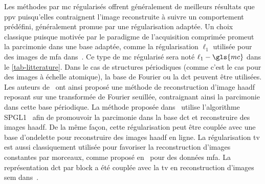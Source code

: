 Les méthodes par \gls{mc} régularisés offrent généralement de meilleurs résultats que \gls{ppv} puisqu'elles contraignent l'image reconstruite à suivre un comportement prédéfini, généralement promue par une régularisation adaptée. Un choix classique puisque motivée par le paradigme de l'acquisition comprimée promeut la parcimonie dans une base adaptée, comme la régularisation $\ell_1$ utilisée pour des images de \gls{mfa} dans~\cite{han2018optimal}. Ce type de \gls{mc} régularisé sera noté $\ell_1-\gls{mc}$ dans le \cref{tab-litterature}. %
Dans le cas de structures périodiques (comme c'est le cas pour des images à échelle atomique), la base de Fourier ou la \gls{dct} peuvent être utilisées. Les auteurs de~\cite{stevens2018apl} ont ainsi proposé une méthode de reconstruction d'image \gls{haadf} reposant sur une transformée de Fourier seuillée, contraignant ainsi la parcimonie dans cette base périodique. La méthode proposée dans~\cite{beche2016development} utilise l'algorithme SPGL1~\cite{berg2008probing} afin de promouvoir la parcimonie dans la base \gls{dct} et reconstruire des images \gls{haadf}. De la même façon, cette régularisation peut être couplée avec une base d'ondelette pour reconstruire des images \gls{haadf} en ligne\cite{li2018compressed}. %
%
La régularisation \gls{tv} est aussi classiquement utilisée pour favoriser la reconstruction d'images constantes par morceaux, comme proposé en~\cite{han2018optimal} pour des données \gls{mfa}. La représentation \gls{dct} par block a été couplée avec la \gls{tv} en reconstruction d'images \gls{sem} dans~\cite{anderson2013sparse}.%



